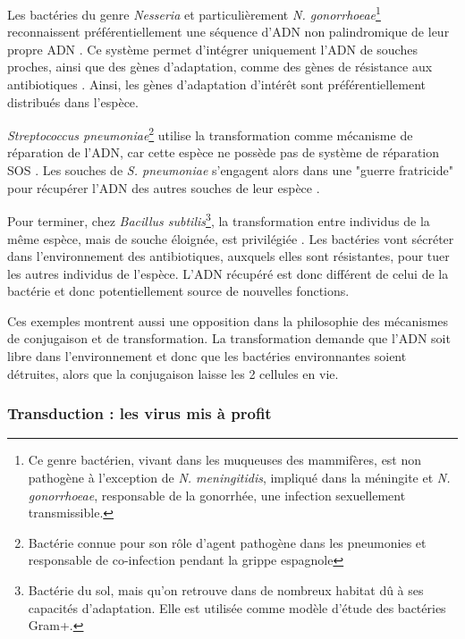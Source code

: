 Les bactéries du genre \textit{Nesseria} et particulièrement \textit{N. gonorrhoeae}\footnote{Ce genre bactérien, vivant dans les muqueuses des mammifères, est non pathogène à l'exception de \textit{N. meningitidis}, impliqué dans la méningite et \textit{N. gonorrhoeae}, responsable de la gonorrhée, une infection sexuellement transmissible.} reconnaissent préférentiellement une séquence d'ADN non palindromique de leur propre ADN \cite{goodman_identification_1988,duffin_dna_2010}. Ce système permet d'intégrer uniquement l'ADN de souches proches, ainsi que des gènes d'adaptation, comme des gènes de résistance aux antibiotiques \cite{centers_for_disease_control_and_prevention_cdc_update_2007}. Ainsi, les gènes d'adaptation d'intérêt sont préférentiellement distribués dans l'espèce.

\textit{Streptococcus pneumoniae}\footnote{Bactérie connue pour son rôle d'agent pathogène dans les pneumonies et responsable de co-infection pendant la grippe espagnole} utilise la transformation comme mécanisme de réparation de l'ADN, car cette espèce ne possède pas de système de réparation SOS \cite{gasc_lack_1980}. Les souches de \textit{S. pneumoniae} s'engagent alors dans une "guerre fratricide" pour récupérer l'ADN des autres souches de leur espèce \cite{claverys_cannibalism_2007}.

Pour terminer, chez \textit{Bacillus subtilis}\footnote{Bactérie du sol, mais qu'on retrouve dans de nombreux habitat dû à ses capacités d'adaptation. Elle est utilisée comme modèle d'étude des bactéries Gram+.}, la transformation entre individus de la même espèce, mais de souche éloignée, est privilégiée \cite{lyons_combinatorial_2016}. Les bactéries vont sécréter dans l'environnement des antibiotiques, auxquels elles sont résistantes, pour tuer les autres individus de l'espèce. L'ADN récupéré est donc différent de celui de la bactérie et donc potentiellement source de nouvelles fonctions.

Ces exemples montrent aussi une opposition dans la philosophie des mécanismes de conjugaison et de transformation. La transformation demande que l'ADN soit libre dans l'environnement et donc que les bactéries environnantes soient détruites, alors que la conjugaison laisse les 2 cellules en vie. 

\subsubsection{Transduction : les virus mis à profit}

